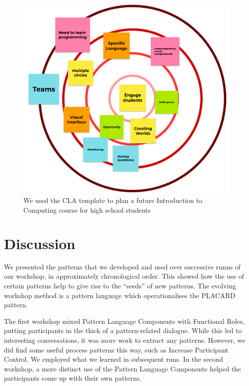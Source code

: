 \documentclass[acmlarge,timestamp]{acmart}
\begin{document}
\begin{figure}[h]
\includegraphics[width=.7\textwidth]{sridevi-course.png}
\caption{We used the CLA template to plan a future Introduction to Computing course for high school students\label{sridevi-course}}
\end{figure}




\section{Discussion}

We presented the patterns that we developed and used over successive
runns of our workshop, in approximately chronological order.  This
showed how the use of certain patterns help to give rise to the
``seeds'' of new patterns.  The evolving workshop method is a pattern
language which operationalises the PLACARD pattern.

The first workshop mixed {\sc Pattern Language Components} with {\sc
  Functional Roles}, putting participants in the thick of a
pattern-related dialogue.  While this led to interesting
conversations, it was more work to extract any patterns.  However, we
did find some useful process patterns this way, such as {\sc Increase
  Participant Control}.  We employed what we learned in subsequent
runs.  In the second workshop, a more distinct use of the {\sc Pattern
  Language Components} helped the participants come up with their own
patterns.
\end{document}
